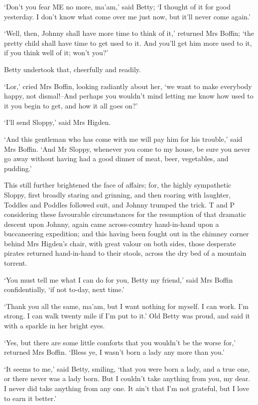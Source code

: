 ‘Don’t you fear ME no more, ma’am,’ said Betty; ‘I thought of it for
good yesterday. I don’t know what come over me just now, but it’ll never
come again.’

‘Well, then, Johnny shall have more time to think of it,’ returned Mrs
Boffin; ‘the pretty child shall have time to get used to it. And you’ll
get him more used to it, if you think well of it; won’t you?’

Betty undertook that, cheerfully and readily.

‘Lor,’ cried Mrs Boffin, looking radiantly about her, ‘we want to make
everybody happy, not dismal!--And perhaps you wouldn’t mind letting me
know how used to it you begin to get, and how it all goes on?’

‘I’ll send Sloppy,’ said Mrs Higden.

‘And this gentleman who has come with me will pay him for his trouble,’
said Mrs Boffin. ‘And Mr Sloppy, whenever you come to my house, be
sure you never go away without having had a good dinner of meat, beer,
vegetables, and pudding.’

This still further brightened the face of affairs; for, the highly
sympathetic Sloppy, first broadly staring and grinning, and then roaring
with laughter, Toddles and Poddles followed suit, and Johnny trumped
the trick. T and P considering these favourable circumstances for
the resumption of that dramatic descent upon Johnny, again came
across-country hand-in-hand upon a buccaneering expedition; and this
having been fought out in the chimney corner behind Mrs Higden’s chair,
with great valour on both sides, those desperate pirates returned
hand-in-hand to their stools, across the dry bed of a mountain torrent.

‘You must tell me what I can do for you, Betty my friend,’ said Mrs
Boffin confidentially, ‘if not to-day, next time.’

‘Thank you all the same, ma’am, but I want nothing for myself. I can
work. I’m strong. I can walk twenty mile if I’m put to it.’ Old Betty
was proud, and said it with a sparkle in her bright eyes.

‘Yes, but there are some little comforts that you wouldn’t be the worse
for,’ returned Mrs Boffin. ‘Bless ye, I wasn’t born a lady any more than
you.’

‘It seems to me,’ said Betty, smiling, ‘that you were born a lady, and
a true one, or there never was a lady born. But I couldn’t take anything
from you, my dear. I never did take anything from any one. It ain’t that
I’m not grateful, but I love to earn it better.’

